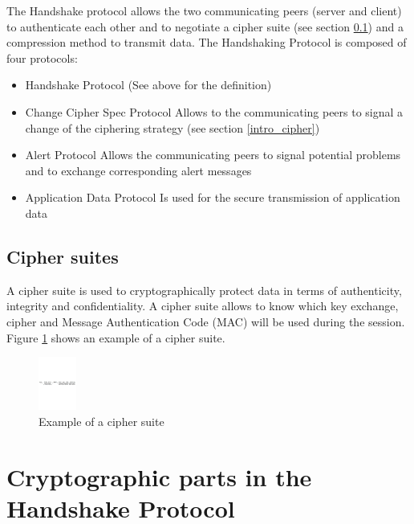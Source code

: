 The Handshake protocol allows the two communicating peers (server and client) to
authenticate each other and to negotiate a cipher suite (see section
\ref{tls_ciph_suite}) and a compression method to transmit data.
The Handshaking Protocol is composed of four protocols:
\begin{itemize}
  \item Handshake Protocol\newline
  (See above for the definition)
  \item Change Cipher Spec Protocol\newline
  Allows to the communicating peers to signal a change of the ciphering strategy
  (see section \ref{intro_cipher})
  \item Alert Protocol\newline
  Allows the communicating peers to signal potential problems and to exchange
  corresponding alert messages
  \item Application Data Protocol\newline
  Is used for the secure transmission of application data
\end{itemize}


\subsection{Cipher suites}
\label{tls_ciph_suite}
A cipher suite \cite{RFC5246} is used to cryptographically protect data in terms
of authenticity, integrity and confidentiality.
A cipher suite allows to know which key exchange, cipher and Message
Authentication Code (MAC) will be used during the session. Figure
\ref{fig:tls_ciph_suite} shows an example of a cipher suite.\newline
 

\begin{figure}[!ht]
\centering
\includegraphics[trim=0cm 13.5cm 0cm 13.5cm,
height=1.75cm]{figures/tls_cipher_suite.pdf}
\caption{Example of a cipher suite}
\label{fig:tls_ciph_suite}

\end{figure}

\newpage

\section{Cryptographic parts in the Handshake Protocol}

